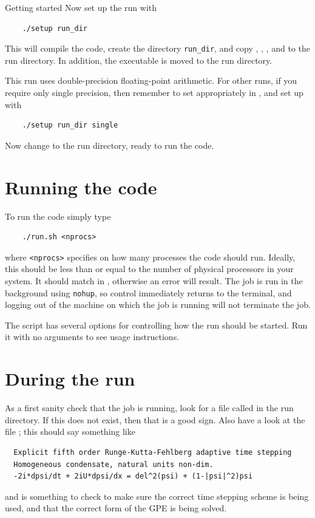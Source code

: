 \begin{chapter}{\label{cha:quickstart}Getting started}
  Now set up the run with
  \begin{Verbatim}
    ./setup run_dir
  \end{Verbatim}
  This will compile the code, create the directory \verb"run_dir", and copy
  , , , and
   to the run directory.  In addition, the executable
   is moved to the run directory.

  This run uses double-precision floating-point arithmetic.  For other runs, if
  you require only single precision, then remember to set 
  appropriately in , and set up with
  \begin{Verbatim}
    ./setup run_dir single
  \end{Verbatim}
  Now change to the run directory, ready to run the code.

  \section{Running the code}
  To run the code simply type
  \begin{Verbatim}
    ./run.sh <nprocs>
  \end{Verbatim}
  where \verb"<nprocs>" specifies on how many processes the code should run.
  Ideally, this should be less than or equal to the number of physical
  processors in your system.  It should match  in
  , otherwise an error will result.  The job is run in
  the background using \verb"nohup", so control immediately returns to the
  terminal, and logging out of the machine on which the job is running will not
  terminate the job.

  The  script has several options for controlling how the run
  should be started.  Run it with no arguments to see usage instructions.

  \section{During the run}
  As a first sanity check that the job is running, look for a file called
   in the run directory.  If this does not exist, then that is a
  good sign.  Also have a look at the file ; this should say
  something like
  \begin{Verbatim}
  Explicit fifth order Runge-Kutta-Fehlberg adaptive time stepping
  Homogeneous condensate, natural units non-dim.
  -2i*dpsi/dt + 2iU*dpsi/dx = del^2(psi) + (1-|psi|^2)psi
  \end{Verbatim}
  and is something to check to make sure the correct time stepping scheme is
  being used, and that the correct form of the GPE is being solved.


\end{chapter}
